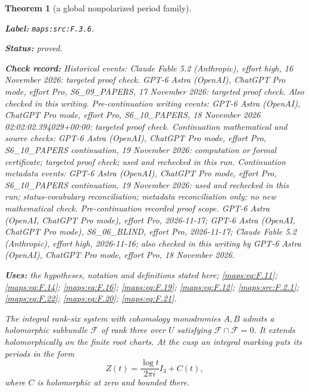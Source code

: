 \documentclass[11pt,a4paper]{article}
\newtheorem{theorem}{Theorem}[section]
\theoremstyle{definition}
\newcommand{\StatementRecord}[4]{\par\smallskip\begingroup\upshape\raggedright\noindent\textbf{Label:} \nolinkurl{#1}.\par\noindent\textbf{Status:} #2.\par\noindent\textbf{Check record:} #3.\par\noindent\textbf{Uses:} #4.\par\endgroup\smallskip}
\begin{document}
\begin{theorem}[a global nonpolarized period family]\label{maps:src:F.3.6}
\StatementRecord{maps:src:F.3.6}{proved}{Historical events: Claude Fable 5.2 (Anthropic), effort high, 16 November 2026: targeted proof check. GPT-6 Astra (OpenAI), ChatGPT Pro mode, effort Pro, S6\_09\_PAPERS, 17 November 2026: targeted proof check. Also checked in this writing. Pre-continuation writing events: GPT-6 Astra (OpenAI), ChatGPT Pro mode, effort Pro, S6\_10\_PAPERS, 18 November 2026 02:02:02.394029+00:00: targeted proof check. Continuation mathematical and source checks: GPT-6 Astra (OpenAI), ChatGPT Pro mode, effort Pro, S6\_10\_PAPERS continuation, 19 November 2026: computation or formal certificate; targeted proof check; used and rechecked in this run. Continuation metadata events: GPT-6 Astra (OpenAI), ChatGPT Pro mode, effort Pro, S6\_10\_PAPERS continuation, 19 November 2026: used and rechecked in this run; status-vocabulary reconciliation; metadata reconciliation only; no new mathematical check. \emph{Pre-continuation recorded proof scope.} GPT-6 Astra (OpenAI, ChatGPT Pro mode), effort Pro, 2026-11-17; GPT-6 Astra (OpenAI, ChatGPT Pro mode), S6\_06\_BLIND, effort Pro, 2026-11-17; Claude Fable 5.2 (Anthropic), effort high, 2026-11-16; also checked in this writing by GPT-6 Astra (OpenAI), ChatGPT Pro mode, effort Pro, 18 November 2026}{the hypotheses, notation and definitions stated here; \cref{maps:eq:F.11}; \cref{maps:eq:F.14}; \cref{maps:eq:F.16}; \cref{maps:eq:F.19}; \cref{maps:eq:F.12}; \cref{maps:src:F.2.1}; \cref{maps:eq:F.22}; \cref{maps:eq:F.20}; \cref{maps:eq:F.21}}


The integral rank-six system with cohomology monodromies $A,B$
admits a holomorphic subbundle $\mathcal F$ of rank three over
$U$ satisfying $\mathcal F\cap\overline{\mathcal F}=0$.
It extends holomorphically on the finite root charts.  At the
cusp an integral marking puts its periods in the form
\[
 Z(t)=\frac{\log t}{2\pi i}I_3+C(t),
 \tag{F.13}\label{maps:eq:F.13}
\]
where $C$ is holomorphic at zero and bounded there.

\end{theorem}
\end{document}

